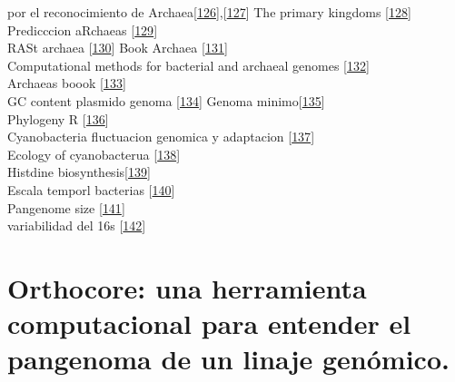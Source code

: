 \documentclass[12pt,twoside]{reedthesis}
\begin{document}
  por el reconocimiento de
  Archaea{[}\protect\hyperlink{ref-woese_are_1981}{126}{]},{[}\protect\hyperlink{ref-woese_towards_1990}{127}{]}
  The primary kingdoms
  {[}\protect\hyperlink{ref-woese_phylogenetic_1977}{128}{]}\\
  Predicccion aRchaeas
  {[}\protect\hyperlink{ref-woese_there_1994}{129}{]}\\
  RASt archaea {[}\protect\hyperlink{ref-graham_archaeal_2000}{130}{]}
  Book Archaea
  {[}\protect\hyperlink{ref-howland_surprising_2000}{131}{]}\\
  Computational methods for bacterial and archaeal genomes
  {[}\protect\hyperlink{ref-xu_computational_2008}{132}{]}\\
  Archaeas boook {[}\protect\hyperlink{ref-garrett_archaea_2008}{133}{]}\\
  GC content plasmido genoma
  {[}\protect\hyperlink{ref-nishida_evolution_2012}{134}{]} Genoma
  minimo{[}\protect\hyperlink{ref-coyle_mysteries_2016}{135}{]}\\
  Phylogeny R {[}\protect\hyperlink{ref-omeara_cran_2016}{136}{]}\\
  Cyanobacteria fluctuacion genomica y adaptacion
  {[}\protect\hyperlink{ref-larsson_genome_2011}{137}{]}\\
  Ecology of cyanobacterua
  {[}\protect\hyperlink{ref-whitton_ecology_2012}{138}{]}\\
  Histdine
  biosynthesis{[}\protect\hyperlink{ref-cohen_biosynthesis_2004}{139}{]}\\
  Escala temporl bacterias
  {[}\protect\hyperlink{ref-battistuzzi_genomic_2004}{140}{]}\\
  Pangenome size
  {[}\protect\hyperlink{ref-lapierre_estimating_2009}{141}{]}\\
  variabilidad del 16s
  {[}\protect\hyperlink{ref-vetrovsky_variability_2013}{142}{]}
  
  \chapter{Orthocore: una herramienta computacional para entender el
  pangenoma de un linaje
  genómico.}\label{orthocore-una-herramienta-computacional-para-entender-el-pangenoma-de-un-linaje-genomico.}
  
\end{document}
